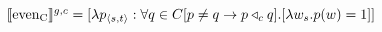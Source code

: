 $\intension[g,c]{even\textsubscript{C}}=[\lambda{p_{\langle s,t\rangle}}:\forall{q\in C}[p\neq q\rightarrow p\lprob_c q].[\lambda{w_s}.p(w)=1]]$